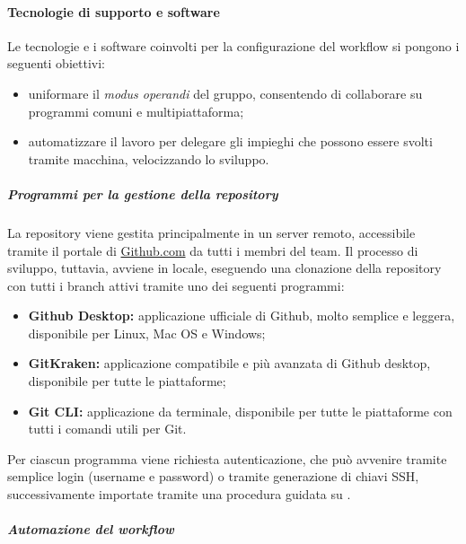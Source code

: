 	\paragraph{Tecnologie di supporto e software}

	Le tecnologie e i software coinvolti per la configurazione del workflow si pongono i seguenti obiettivi:
	\begin{itemize}
		\item uniformare il \textit{modus operandi} del gruppo, consentendo di collaborare su programmi comuni e multipiattaforma;
		\item automatizzare il lavoro per delegare gli impieghi che possono essere svolti tramite macchina, velocizzando lo sviluppo.
	\end{itemize}

		\subparagraph{Programmi per la gestione della repository}

		La repository viene gestita principalmente in un server remoto, accessibile tramite il portale di \href{https://github.com}{Github.com} da tutti i membri del team.
		Il processo di sviluppo, tuttavia, avviene in locale, eseguendo una clonazione della repository con tutti i branch attivi tramite uno dei seguenti programmi:
		\begin{itemize}
			\item \textbf{Github Desktop:} applicazione ufficiale di Github, molto semplice e leggera, disponibile per Linux, Mac OS e Windows;
			\item \textbf{GitKraken:} applicazione compatibile e più avanzata di Github desktop, disponibile per tutte le piattaforme;
			\item \textbf{Git CLI:} applicazione da terminale, disponibile per tutte le piattaforme con tutti i comandi utili per Git.
		\end{itemize}
		Per ciascun programma viene richiesta autenticazione, che può avvenire tramite semplice login (username e password) o tramite generazione di chiavi SSH, successivamente importate tramite una procedura guidata su .

		\subparagraph{Automazione del workflow}

